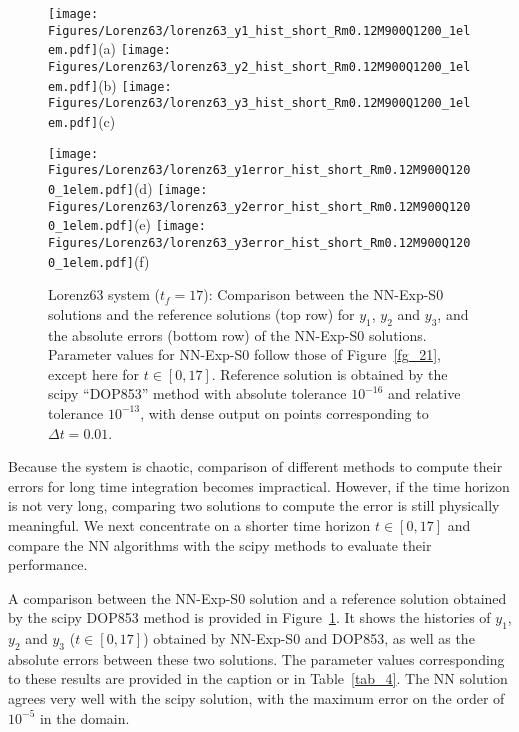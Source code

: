 \begin{figure}
  \centerline{
    \texttt{[image: Figures/Lorenz63/lorenz63\_y1\_hist\_short\_Rm0.12M900Q1200\_1elem.pdf]}(a)
    \texttt{[image: Figures/Lorenz63/lorenz63\_y2\_hist\_short\_Rm0.12M900Q1200\_1elem.pdf]}(b)
    \texttt{[image: Figures/Lorenz63/lorenz63\_y3\_hist\_short\_Rm0.12M900Q1200\_1elem.pdf]}(c)
  }
  \centerline{
    \texttt{[image: Figures/Lorenz63/lorenz63\_y1error\_hist\_short\_Rm0.12M900Q1200\_1elem.pdf]}(d)
    \texttt{[image: Figures/Lorenz63/lorenz63\_y2error\_hist\_short\_Rm0.12M900Q1200\_1elem.pdf]}(e)
    \texttt{[image: Figures/Lorenz63/lorenz63\_y3error\_hist\_short\_Rm0.12M900Q1200\_1elem.pdf]}(f)
  }
  \caption{Lorenz63 system ($t_f=17$): Comparison between the NN-Exp-S0 solutions and
    the reference solutions (top row) for $y_1$, $y_2$ and $y_3$, and
    the absolute errors (bottom row) 
     of the NN-Exp-S0 solutions.
     Parameter values for NN-Exp-S0 follow those of Figure~\ref{fg_21},
     except here for $t\in[0,17]$.
     Reference solution is obtained by the scipy ``DOP853'' method
     with absolute tolerance $10^{-16}$
     and relative tolerance $10^{-13}$, with
     dense output on points corresponding to $\Delta t=0.01$.
  }
  \label{fg_22}
\end{figure}

Because the system is chaotic, comparison of different methods to compute their errors
for long time integration becomes impractical. However,
if the time horizon is not very long, comparing two solutions to compute
the error is still physically meaningful.
We next concentrate on a shorter time horizon $t\in[0,17]$ and compare
the NN algorithms with the scipy methods to evaluate their performance.

A comparison between the NN-Exp-S0 solution and a reference solution
obtained by the scipy DOP853 method is provided in Figure~\ref{fg_22}.
It shows the histories of $y_1$, $y_2$ and $y_3$ ($t\in[0,17]$)
obtained by NN-Exp-S0 and DOP853,  as well
as the absolute errors between these two solutions.
The parameter values corresponding to these results are
provided in the caption or in Table~\ref{tab_4}.
The NN solution agrees very well with the scipy solution,
with the maximum error on the order of $10^{-5}$ in the domain.


